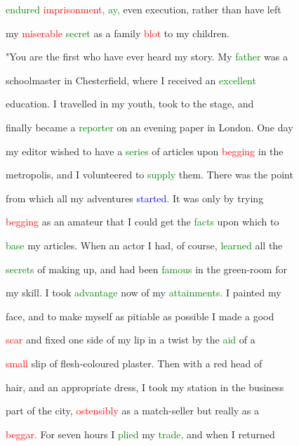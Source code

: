  \textcolor{green}{endured} \textcolor{red}{imprisonment,} \textcolor{green}{ay,} even \textcolor{BurntOrange}{execution,} rather than have left

 my \textcolor{red}{miserable} \textcolor{green}{secret} as a family \textcolor{red}{blot} to my \textcolor{BurntOrange}{children.}



 "You are the first who have ever heard my story. My \textcolor{green}{father} was a

 schoolmaster in Chesterfield, where I received an \textcolor{green}{excellent}

 education. I travelled in my \textcolor{BurntOrange}{youth,} took to the stage, and

 \textcolor{BurntOrange}{finally} became a \textcolor{green}{reporter} on an evening paper in London. One day

 my editor wished to have a \textcolor{green}{series} of articles upon \textcolor{red}{begging} in the

 metropolis, and I \textcolor{BurntOrange}{volunteered} to \textcolor{green}{supply} them. There was the point

 from which all my \textcolor{BurntOrange}{adventures} \textcolor{blue}{started.} It was only by trying

 \textcolor{red}{begging} as an amateur that I could get the \textcolor{green}{facts} upon which to

 \textcolor{green}{base} my articles. When an actor I had, of course, \textcolor{green}{learned} all the

 \textcolor{green}{secrets} of making up, and had been \textcolor{green}{famous} in the green-room for

 my skill. I took \textcolor{green}{advantage} now of my \textcolor{green}{attainments.} I painted my

 face, and to make myself as pitiable as possible I made a \textcolor{BurntOrange}{good}

 \textcolor{red}{scar} and fixed one side of my lip in a twist by the \textcolor{green}{aid} of a

 \textcolor{red}{small} \textcolor{BurntOrange}{slip} of flesh-coloured plaster. Then with a red head of

 hair, and an appropriate dress, I took my station in the business

 part of the city, \textcolor{red}{ostensibly} as a match-seller but really as a

 \textcolor{red}{beggar.} For seven hours I \textcolor{green}{plied} my \textcolor{green}{trade,} and when I returned

